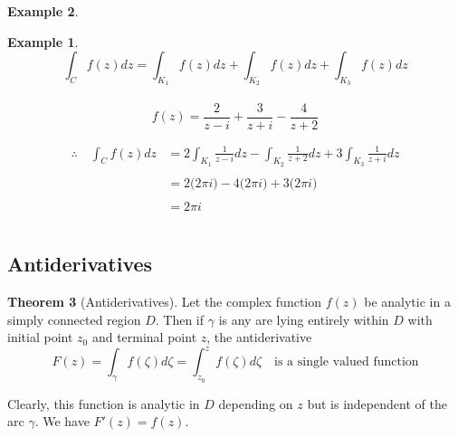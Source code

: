 \documentclass[11pt,a4paper]{article}
\theoremstyle{definition}
\newtheorem{thm}{Theorem}[section]
\newtheorem{example}[thm]{Example}
\begin{document}
\begin{example}
\begin{example}
$$\int_C f(z) dz = \int_{K_1}f(z)dz + \int_{K_2}f(z)dz + \int_{K_3}f(z)dz$$\\

$$f(z) = \frac{2}{z  - i} + \frac{3}{z + i} - \frac{4}{z + 2}$$


\begin{align*}
\therefore\quad  \int_C f(z)dz & = 2 \int_{K_1} \frac{1}{z  - i}dz - \int_{K_2}\frac{1}{z + 2}dz + 3\int_{K_3}\frac{1}{z + i}dz\\\\
& = 2\big(2\pi i\big) - 4\big(2\pi i\big) + 3\big(2\pi i\big)\\\\
& = 2\pi i\\\\
\end{align*}
\end{example}
\end{example}

{\color[wave]{485}\subsection{Antiderivatives}}

\begin{thm}[Antiderivatives]
Let the complex function $f(z)$ be analytic in a simply connected region $D$. Then if $\gamma$ is any are lying entirely within $D$ with initial point $z_0$ and terminal point $z$, the antiderivative $$ F(z) = \int_{\gamma} f(\zeta)d\zeta = \int^{z}_{z_0} f(\zeta) d\zeta\quad \text{is a single valued function}$$


Clearly, this function is analytic in $D$ depending on $z$ but is independent of the arc $\gamma$. We have $F'(z) = f(z)$.
\end{thm}
\end{document}
